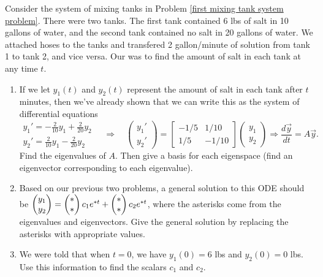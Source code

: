 

















\begin{problem}
Consider the system of mixing tanks in Problem \ref{first mixing tank system problem}.   
There were two tanks. The first tank contained 6 lbs of salt in 10 gallons of water, and the second tank contained no salt in 20 gallons of water. We attached hoses to the tanks and transfered 2 gallon/minute of solution from tank 1 to tank 2, and vice versa. Our was to find the amount of salt in each tank at any time $t$. 
\begin{enumerate}
 \item If we let $y_1(t)$ and $y_2(t)$ represent the amount of salt in each tank after $t$ minutes, then we've already shown that we can write this as the system of differential equations
$$
\begin{array}{l}
 y_1 ' = -\frac{2}{10}y_1+\frac{2}{20}y_2\\
 y_2 ' = \frac{2}{10}y_1-\frac{2}{20}y_2
\end{array}
\quad\Rightarrow\quad
\begin{pmatrix}
 y_1'\\y_2'
\end{pmatrix}
=
\begin{bmatrix}
 -1/5 & 1/10\\
 1/5 & -1/10
\end{bmatrix}
\begin{pmatrix}
 y_1\\y_2
\end{pmatrix}
\Rightarrow
\dfrac{d\vec{y}}{dt} =A\vec y. 
$$
Find the eigenvalues of $A$. Then give a basis for each eigenspace (find an eigenvector corresponding to each eigenvalue). 
\item 
Based on our previous two problems, a general solution to this ODE should be 
$\begin{pmatrix} y_1\\y_2 \end{pmatrix}  = \begin{pmatrix} *\\ * \end{pmatrix} c_1 e^{* t}+\begin{pmatrix} *\\ * \end{pmatrix} c_2 e^{* t}$, where the asterisks come from the eigenvalues and eigenvectors. Give the general solution by replacing the asterisks with appropriate values.
\item We were told that when $t=0$, we have $y_1(0)=6$ lbs and $y_2(0)=0$ lbs. Use this information to find the scalars $c_1$ and $c_2$.  
\end{enumerate}
\end{problem}

